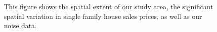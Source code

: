 \documentclass{article}\usepackage{graphicx, color}
\begin{document}
\begin{figure}
\caption{This figure shows the spatial extent of our study area, the significant spatial variation in single family house sales prices, as well as our noise data.}
\label{fig:overview}
\end{figure}
\end{document}

